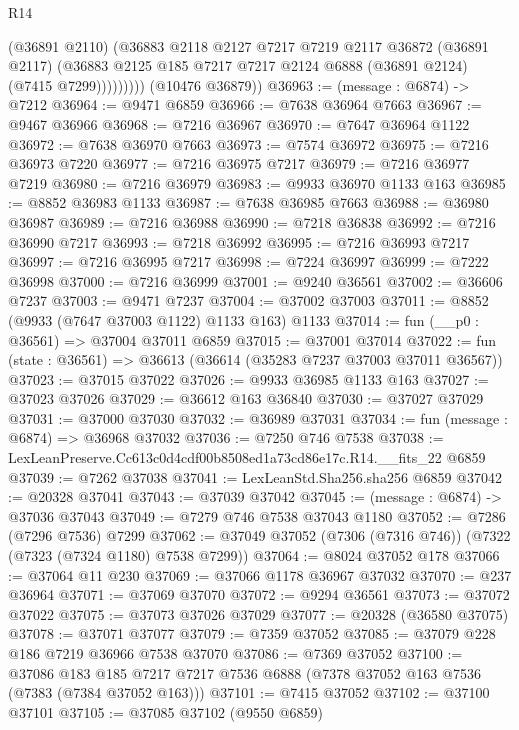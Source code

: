 \begin{lexlean}{R14}
\begin{coremodule}
                  (@36891 @2110)
                  (@36883
                    @2118
                    @2127
                    @7217
                    @7219
                    @2117
                    @36872
                    (@36891 @2117)
                    (@36883 @2125 @185 @7217 @7217 @2124 @6888 (@36891 @2124) (@7415 @7299)))))))))
      (@10476 @36879))
@36963 := (message : @6874) -> @7212
@36964 := @9471 @6859
@36966 := @7638 @36964 @7663
@36967 := @9467 @36966
@36968 := @7216 @36967
@36970 := @7647 @36964 @1122
@36972 := @7638 @36970 @7663
@36973 := @7574 @36972
@36975 := @7216 @36973 @7220
@36977 := @7216 @36975 @7217
@36979 := @7216 @36977 @7219
@36980 := @7216 @36979
@36983 := @9933 @36970 @1133 @163
@36985 := @8852 @36983 @1133
@36987 := @7638 @36985 @7663
@36988 := @36980 @36987
@36989 := @7216 @36988
@36990 := @7218 @36838
@36992 := @7216 @36990 @7217
@36993 := @7218 @36992
@36995 := @7216 @36993 @7217
@36997 := @7216 @36995 @7217
@36998 := @7224 @36997
@36999 := @7222 @36998
@37000 := @7216 @36999
@37001 := @9240 @36561
@37002 := @36606 @7237
@37003 := @9471 @7237
@37004 := @37002 @37003
@37011 := @8852 (@9933 (@7647 @37003 @1122) @1133 @163) @1133
@37014 := fun (__p0 : @36561) => @37004 @37011 @6859
@37015 := @37001 @37014
@37022 := fun (state : @36561) => @36613 (@36614 (@35283 @7237 @37003 @37011 @36567))
@37023 := @37015 @37022
@37026 := @9933 @36985 @1133 @163
@37027 := @37023 @37026
@37029 := @36612 @163 @36840
@37030 := @37027 @37029
@37031 := @37000 @37030
@37032 := @36989 @37031
@37034 := fun (message : @6874) => @36968 @37032
@37036 := @7250 @746 @7538
@37038 := LexLeanPreserve.Cc613c0d4cdf00b8508ed1a73cd86e17c.R14.__fits_22 @6859
@37039 := @7262 @37038
@37041 := LexLeanStd.Sha256.sha256 @6859
@37042 := @20328 @37041
@37043 := @37039 @37042
@37045 := (message : @6874) -> @37036 @37043
@37049 := @7279 @746 @7538 @37043 @1180
@37052 := @7286 (@7296 @7536) @7299
@37062 := @37049 @37052 (@7306 (@7316 @746)) (@7322 (@7323 (@7324 @1180) @7538 @7299))
@37064 := @8024 @37052 @178
@37066 := @37064 @11 @230
@37069 := @37066 @1178 @36967 @37032
@37070 := @237 @36964
@37071 := @37069 @37070
@37072 := @9294 @36561
@37073 := @37072 @37022
@37075 := @37073 @37026 @37029
@37077 := @20328 (@36580 @37075)
@37078 := @37071 @37077
@37079 := @7359 @37052
@37085 := @37079 @228 @186 @7219 @36966 @7538 @37070
@37086 := @7369 @37052
@37100 := @37086
    @183
    @185
    @7217
    @7217
    @7536
    @6888
    (@7378 @37052 @163 @7536 (@7383 (@7384 @37052 @163)))
@37101 := @7415 @37052
@37102 := @37100 @37101
@37105 := @37085 @37102 (@9550 @6859)

\end{coremodule}
\end{lexlean}
